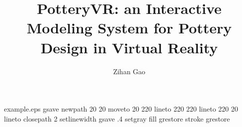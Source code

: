 %
%
%
%
%
\begin{filecontents*}{example.eps}
gsave
newpath
  20 20 moveto
  20 220 lineto
  220 220 lineto
  220 20 lineto
closepath
2 setlinewidth
gsave
  .4 setgray fill
grestore
stroke
grestore
\end{filecontents*}
%
\RequirePackage{fix-cm}
%
\documentclass{svjour3}                     %
%
\smartqed  %
%
\usepackage{graphicx}
\usepackage{amsmath}
\usepackage{enumitem}
%
%
%
%
%


\title{PotteryVR: an Interactive Modeling System for Pottery Design in Virtual Reality%
}


\author{Zihan Gao         %
}


